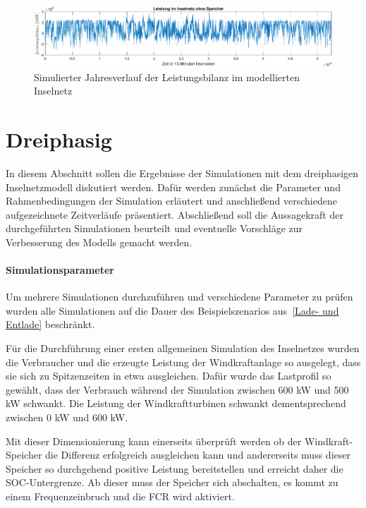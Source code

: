 \begin{figure}[H]
	\centering
	\includegraphics[width=\linewidth]{Abbildungen/HelgolandBilanzOhne.eps}
	\caption{Simulierter Jahresverlauf der Leistungsbilanz im modellierten Inselnetz}
	\label{fig:helgolandBilanzOhne}
\end{figure}

\section{Dreiphasig}

In diesem Abschnitt sollen die Ergebnisse der Simulationen mit dem dreiphasigen Inselnetzmodell diskutiert werden.
Dafür werden zunächst die Parameter und Rahmenbedingungen der Simulation erläutert und anschließend verschiedene 
aufgezeichnete Zeitverläufe präsentiert.
Abschließend soll die Aussagekraft der durchgeführten Simulationen beurteilt und eventuelle Vorschläge 
zur Verbesserung des Modells gemacht werden.

\paragraph{Simulationsparameter}
Um mehrere Simulationen durchzuführen und verschiedene Parameter zu prüfen wurden alle Simulationen auf die Dauer 
des Beispielszenarios aus~\ref{Lade- und Entlade} beschränkt.

Für die Durchführung einer ersten allgemeinen Simulation des Inselnetzes wurden die Verbraucher und die erzeugte
Leistung der Windkraftanlage so ausgelegt, dass sie sich zu Spitzenzeiten in etwa ausgleichen.
Dafür wurde das Lastprofil so gewählt, dass der Verbrauch während der Simulation zwischen 600 kW und 500 kW schwankt.
Die Leistung der Windkraftturbinen schwankt dementsprechend zwischen 0 kW und 600 kW.

Mit dieser Dimensionierung kann einerseits überprüft werden ob der Windkraft-Speicher die Differenz erfolgreich ausgleichen kann
und andererseits muss dieser Speicher so durchgehend positive Leistung bereitstellen und erreicht daher die SOC-Untergrenze.
Ab dieser muss der Speicher sich abschalten, es kommt zu einem Frequenzeinbruch und die FCR wird aktiviert.

